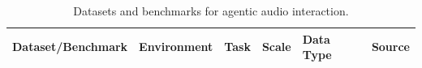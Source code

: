 \begin{table}[t]
    \centering
    \caption{Datasets and benchmarks for agentic audio interaction.}
    \label{tab:agentic-audio-benchmarks}
    \small
    \begin{tabular}{l|l|l|l|l|l}
        \toprule
        Dataset/Benchmark & Environment & Task & Scale & Data Type & Source \\
        \midrule
        \bottomrule
    \end{tabular}
\end{table}
